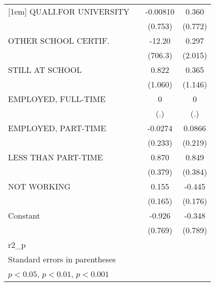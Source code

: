 {\begin{tabular}{l*{3}{c}}
[1em]
QUALI.FOR UNIVERSITY          &                   &  -0.00810         &     0.360         \\
                              &                   &   (0.753)         &   (0.772)         \\
[1em]
OTHER SCHOOL CERTIF.          &                   &    -12.20         &     0.297         \\
                              &                   &   (706.3)         &   (2.015)         \\
[1em]
STILL AT SCHOOL               &                   &     0.822         &     0.365         \\
                              &                   &   (1.060)         &   (1.146)         \\
[1em]
EMPLOYED, FULL-TIME           &                   &         0         &         0         \\
                              &                   &       (.)         &       (.)         \\
[1em]
EMPLOYED, PART-TIME           &                   &   -0.0274         &    0.0866         \\
                              &                   &   (0.233)         &   (0.219)         \\
[1em]
LESS THAN PART-TIME           &                   &     0.870\sym{*}  &     0.849\sym{*}  \\
                              &                   &   (0.379)         &   (0.384)         \\
[1em]
NOT WORKING                   &                   &     0.155         &    -0.445\sym{*}  \\
                              &                   &   (0.165)         &   (0.176)         \\
[1em]
Constant                      &                   &    -0.926         &    -0.348         \\
                              &                   &   (0.769)         &   (0.789)         \\
\hline
r2\_p                          &                   &                   &                   \\
\hline\hline
\multicolumn{4}{l}{\footnotesize Standard errors in parentheses}\\
\multicolumn{4}{l}{\footnotesize \sym{*} \(p<0.05\), \sym{**} \(p<0.01\), \sym{***} \(p<0.001\)}\\
\end{tabular}
}
